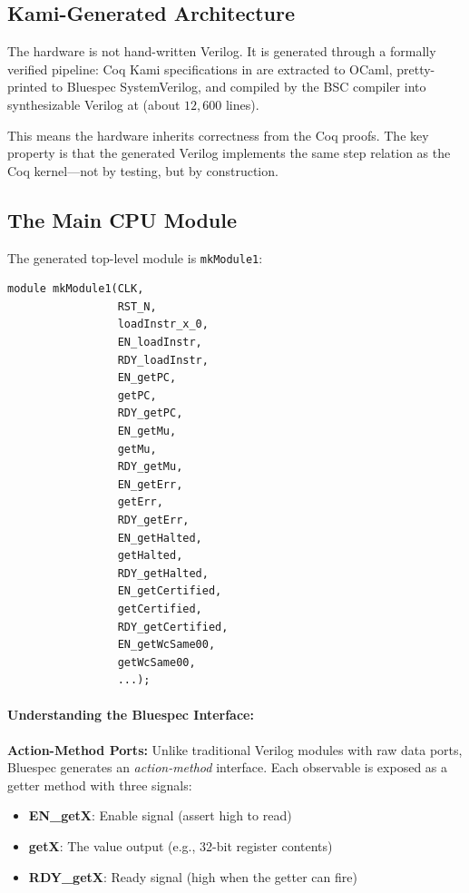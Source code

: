 \subsection{Kami-Generated Architecture}

The hardware is not hand-written Verilog. It is generated through a formally verified pipeline: Coq Kami specifications in  are extracted to OCaml, pretty-printed to Bluespec SystemVerilog, and compiled by the BSC compiler into synthesizable Verilog at  (about $12{,}600$ lines).

This means the hardware inherits correctness from the Coq proofs. The key property is that the generated Verilog implements the same step relation as the Coq kernel---not by testing, but by construction.

\subsection{The Main CPU Module}

The generated top-level module is \texttt{mkModule1}:
\begin{lstlisting}
module mkModule1(CLK,
                 RST_N,
                 loadInstr_x_0,
                 EN_loadInstr,
                 RDY_loadInstr,
                 EN_getPC,
                 getPC,
                 RDY_getPC,
                 EN_getMu,
                 getMu,
                 RDY_getMu,
                 EN_getErr,
                 getErr,
                 RDY_getErr,
                 EN_getHalted,
                 getHalted,
                 RDY_getHalted,
                 EN_getCertified,
                 getCertified,
                 RDY_getCertified,
                 EN_getWcSame00,
                 getWcSame00,
                 ...);
\end{lstlisting}

\paragraph{Understanding the Bluespec Interface:}
\textbf{Action-Method Ports:} Unlike traditional Verilog modules with raw data ports, Bluespec generates an \emph{action-method} interface. Each observable is exposed as a getter method with three signals:
\begin{itemize}
    \item \textbf{EN\_getX}: Enable signal (assert high to read)
    \item \textbf{getX}: The value output (e.g., 32-bit register contents)
    \item \textbf{RDY\_getX}: Ready signal (high when the getter can fire)
\end{itemize}

